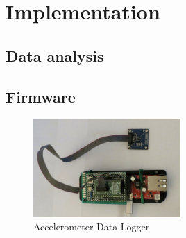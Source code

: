 \chapter{Implementation} \label{section:implementation} 

\section{Data analysis}


\section{Firmware}


\begin{figure}[h]
    \centering
    \includegraphics[width=0.5\textwidth]{assets/design/sensor/data-logger.jpg}
    \caption{Accelerometer Data Logger}
\end{figure}


